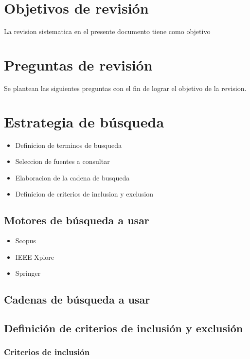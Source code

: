 \documentclass{report}
\begin{document}
\section{Objetivos de revisión}
La revision sistematica en el presente documento tiene como objetivo

\section{Preguntas de revisión}

Se plantean las siguientes preguntas con el fin de lograr el objetivo de la
revision.

\section{Estrategia de búsqueda}

\begin{itemize}
    \item{Definicion de terminos de busqueda}
    \item{Seleccion de fuentes a consultar}
    \item{Elaboracion de la cadena de busqueda}
    \item{Definicion de criterios de inclusion y exclusion}
\end{itemize}

\subsection{Motores de búsqueda a usar}

\begin{itemize}
    \item{Scopus}
    \item{IEEE Xplore}
    \item{Springer}
\end{itemize}

\subsection{Cadenas de búsqueda a usar}


\subsection{Definición de criterios de inclusión y exclusión}

\subsubsection{Criterios de inclusión}
\end{document}

